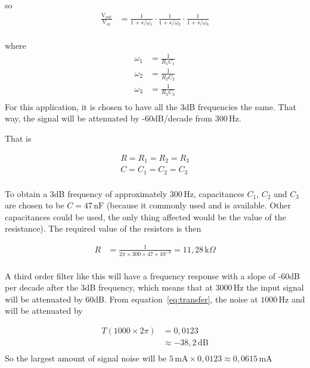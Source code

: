 \documentclass[11pt,a4paper,titlepage]{article}
\newcommand{\mA}{\,\textrm{mA}}
\newcommand{\Hz}{\,\textrm{Hz}}
\newcommand{\kOhm}{\,\text{k}\Omega}
\newcommand{\nF}{\,\textrm{nF}}
\newcommand{\dB}{\,\textrm{dB}}
\begin{document}
	\noindent so
	\begin{equation}
	\begin{aligned}
		\frac{\text{V}_{out}}{\text{V}_{in}} &= \frac{1}{1 + s/\omega_1} \cdot \frac{1}{1 + s/\omega_2} \cdot \frac{1}{1 + s/\omega_3}\\
		 \label{eq:transfer}
	\end{aligned}
	\end{equation}

	\noindent where 
	\[
	\begin{aligned}
		\omega_1 &= \frac{1}{R_1C_1}\\
		\omega_2 &= \frac{1}{R_2C_2}\\
		\omega_3 &= \frac{1}{R_3C_3}\\
	\end{aligned}
	\]
	 For this application, it is chosen to have all the 3dB frequencies the same. That way, the signal will be attenuated by -60dB/decade from 300\Hz.
	 
	 \noindent That is
	 
	 \[
	 \begin{aligned}
		 R = R_1 = R_2 = R_3\\
		 C = C_1 = C_2 = C_3\\
	 \end{aligned}
	 \]
	 
	 \noindent To obtain a 3dB frequency of approximately 300\Hz, capacitances $C_1$, $C_2$ and $C_3$ are chosen to be $C = 47\nF$ (because it commonly used and is available. Other capacitances could be used, the only thing affected would be the value of the resistance). The required value of the resistors is then 
	 
	 \[
	 \begin{aligned}
		 R &= \frac{1}{2\pi\times 300 \times 47\times 10^{-9}} = 11,28\kOhm \\
	\end{aligned}
	 \]
	
	\noindent A third order filter like this will have a frequency response with a slope of -60dB per decade after the 3dB frequency, which means that at $3000\Hz$ the input signal will be attenuated by 60dB. From equation~\ref{eq:transfer}, the noise at $1000\Hz$ and will be attenuated by 
	
	\[
	\begin{aligned}
		T(1000\times 2\pi) &= 0,0123\\
		&\approx -38,2\dB\\
	\end{aligned}
	\]
	\noindent So the largest amount of signal noise will be $5\mA \times 0,0123 \approx 0,0615\mA$ 
	
\end{document}

